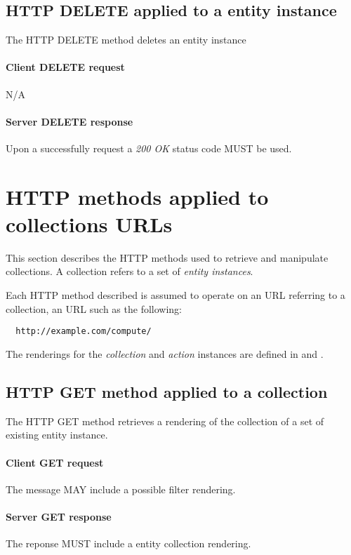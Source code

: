 \documentclass[10pt,a4paper]{article}
\begin{document}
\subsection{HTTP DELETE applied to a entity instance}
The HTTP DELETE method deletes an entity instance

\paragraph{Client DELETE request}
N/A

\paragraph{Server DELETE response}
Upon a successfully request a \emph{200 OK} status code MUST be used.

\section{HTTP methods applied to collections URLs}
This section describes the HTTP methods used to retrieve and manipulate
collections. A collection refers to a set of {\em entity instances}.

Each HTTP method described is assumed to operate
on an URL referring to a collection, an URL such as the following:
\begin{verbatim}
  http://example.com/compute/
\end{verbatim}

The renderings for the {\em collection} and {\em action} instances are defined in \cite{occi:text} and \cite{occi:json}.

\subsection{HTTP GET method applied to a collection}
The HTTP GET method retrieves a rendering of the collection of a set of existing entity instance.

\paragraph{Client GET request}
The message MAY include a possible filter rendering.

\paragraph{Server GET response}
The reponse MUST include a entity collection rendering.
\end{document}
